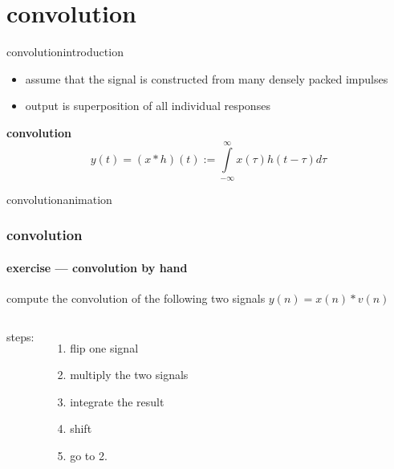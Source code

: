     \section{convolution}
        \begin{frame}{convolution}{introduction}

            \begin{itemize}
                \item<2-> assume that the signal is constructed from many densely packed impulses
                \item<2->[$\Rightarrow$] output is superposition of all individual responses
            \end{itemize}
            \pause
            \bigskip
            \textbf{convolution}
            \begin{equation*}
                y(t) = (x \ast h)(t) := \int\limits_{-\infty}^{\infty}x(\tau)h(t-\tau)d\tau
            \end{equation*}
        \end{frame}
\begin{frame}{convolution}{animation}
            \vspace{-5mm}
\end{frame}
    
\begin{frame}\frametitle{convolution}\framesubtitle{exercise --- convolution by hand}
    compute the convolution of the following two signals $y(n) = x(n) * v(n)$
    
    \vspace{-4mm}
    \begin{columns}
        steps:
        \begin{enumerate}
            \item   flip one signal
            \item   multiply the two signals
            \item   integrate the result
            \item   shift
            \item   go to 2.
        \end{enumerate}
    \end{columns}
\end{frame}
    
